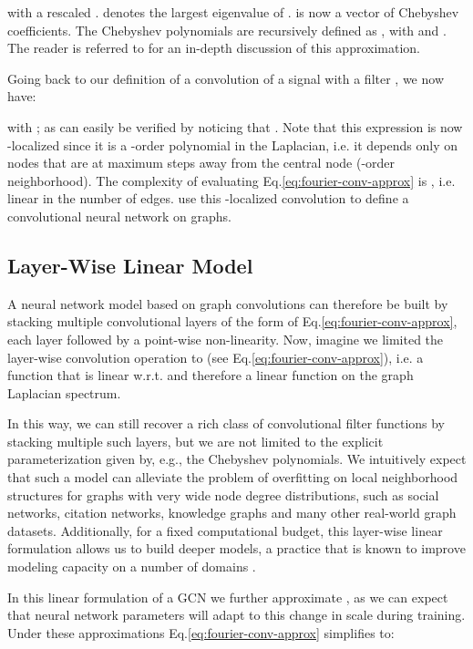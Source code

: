 \documentclass{article} \usepackage{iclr2017_conference,times}
\makeatletter
\newcommand*{\eg}{e.g.\@\xspace}
\newcommand*{\ie}{i.e.\@\xspace}
\newcommand*{\wrt}{w.r.t.\@\xspace}
\newcommand*{\eq}{Eq.\@\xspace}
\makeatother
\begin{document}
with a rescaled .  denotes the largest eigenvalue of .  is now a vector of Chebyshev coefficients. The Chebyshev polynomials are recursively defined as , with  and . The reader is referred to \cite{hammond2011wavelets} for an in-depth discussion of this approximation.

Going back to our definition of a convolution of a signal  with a filter , we now have:

with ; as can easily be verified by noticing that . Note that this expression is now -localized since it is a -order polynomial in the Laplacian, \ie it depends only on nodes that are at maximum  steps away from the central node (-order neighborhood). The complexity of evaluating \eq \ref{eq:fourier-conv-approx} is , \ie linear in the number of edges. \cite{defferrard2016convolutional} use this -localized convolution to define a convolutional neural network on graphs.

\subsection{Layer-Wise Linear Model}
\label{sec:linear-model}
A neural network model based on graph convolutions can therefore be built by stacking multiple convolutional layers of the form of \eq \ref{eq:fourier-conv-approx}, each layer followed by a point-wise non-linearity. Now, imagine we limited the layer-wise convolution operation to  (see \eq \ref{eq:fourier-conv-approx}), \ie a function that is linear \wrt  and therefore a linear function on the graph Laplacian spectrum.

In this way, we can still recover a rich class of convolutional filter functions by stacking multiple such layers, but we are not limited to the explicit parameterization given by, \eg, the Chebyshev polynomials. We intuitively expect that such a model can alleviate the problem of overfitting on local neighborhood structures for graphs with very wide node degree distributions, such as social networks, citation networks, knowledge graphs and many other real-world graph datasets. Additionally, for a fixed computational budget, this layer-wise linear formulation allows us to build deeper models, a practice that is known to improve modeling capacity on a number of domains \citep{he2015deep}.

In this linear formulation of a GCN we further approximate , as we can expect that neural network parameters will adapt to this change in scale during training. Under these approximations \eq \ref{eq:fourier-conv-approx} simplifies to:
\end{document}
